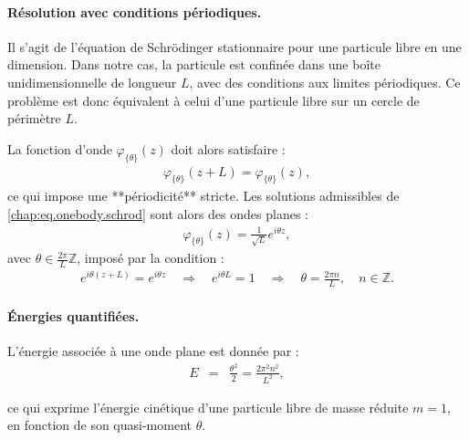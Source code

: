 


\paragraph{Résolution avec conditions périodiques.}

Il s'agit de l’équation de Schrödinger stationnaire pour une particule libre en une dimension. Dans notre cas, la particule est confinée dans une boîte unidimensionnelle de longueur $L$, avec des conditions aux limites périodiques. Ce problème est donc équivalent à celui d’une particule libre sur un cercle de périmètre $L$.

La fonction d’onde $\varphi_{\{\theta\}}(z)$ doit alors satisfaire :
\begin{eqnarray}
	\varphi_{\{\theta\}}(z+L) = \varphi_{\{\theta\}}(z),
\end{eqnarray}
ce qui impose une **périodicité** stricte. Les solutions admissibles de \eqref{chap:eq.onebody.schrod} sont alors des ondes planes :
\begin{eqnarray}
	\varphi_{\{\theta\}}(z) = \frac{1}{\sqrt{L}} e^{i \theta z},
\end{eqnarray}
avec $\theta \in \frac{2\pi}{L} \mathbb{Z}$, imposé par la condition :
\begin{eqnarray}
	e^{i \theta(z+L)} = e^{i \theta z} \quad \Rightarrow \quad e^{i \theta L} = 1 \quad \Rightarrow \quad \theta = \frac{2\pi n}{L}, \quad n \in \mathbb{Z}.
\end{eqnarray}


\paragraph{Énergies quantifiées.}

L’énergie associée à une onde plane est donnée par :
\begin{eqnarray}
	E & = & \frac{\theta^2}{2} = \frac{2\pi^2 n^2}{L^2},
\end{eqnarray}

ce qui exprime l’énergie cinétique d’une particule libre de masse réduite $m = 1$, en fonction de son quasi-moment $\theta$.

